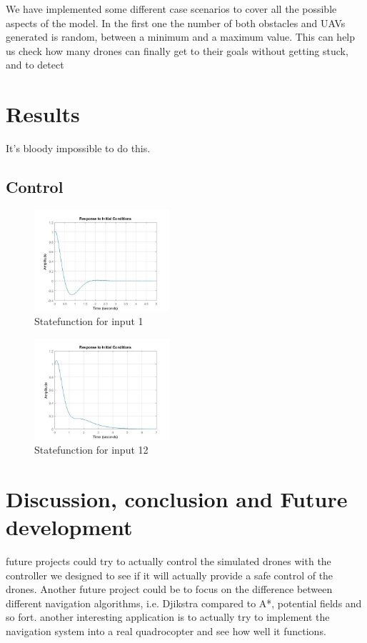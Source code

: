 \documentclass[journal]{IEEEtran}
\begin{document}
	We have implemented some different case scenarios to cover all the possible aspects of the model. In the first one the number of both obstacles and UAVs generated is random, between a minimum and a maximum value. This can help us check how many drones can finally get to their goals without getting stuck, and to detect 
	
	\section{Results}
	It's bloody impossible to do this.
	\subsection{Control}
		\begin{figure}[h]
  			\centering
  			\includegraphics[width=5cm]{Results/Controll/Fig1}
  			\caption{Statefunction for input 1}
  			\label{fig:contresfig1}
		\end{figure}	
		
		\begin{figure}[h]
  			\centering
  			\includegraphics[width=5cm]{Results/Controll/Fig12}
  			\caption{Statefunction for input 12}
  			\label{fig:contresfig12}
		\end{figure}	
		
		
		
	\section{Discussion, conclusion and Future development}
	future projects could try to actually control the simulated drones with the controller we designed to see if it will actually provide a safe control of the drones. Another future project could be to focus on the difference between different navigation algorithms, i.e. Djikstra compared to A*, potential fields and so fort. another interesting application is to actually try to implement the navigation system into a real quadrocopter and see how well it functions.	
	
\end{document}
